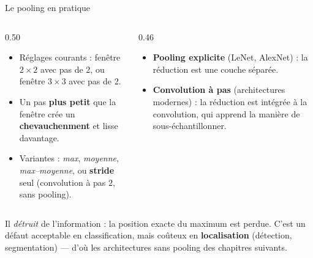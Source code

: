 \begin{frame}{Le pooling en pratique}
\begin{columns}[t]
\begin{column}{0.50\textwidth}
\begin{itemize}
  \item Réglages courants : fenêtre $2 \times 2$ avec pas de $2$, ou
  fenêtre $3 \times 3$ avec pas de $2$.
  \item Un pas \textbf{plus petit} que la fenêtre crée un \textbf{chevauchenment}
  et lisse davantage.
  \item Variantes : \emph{max}, \emph{moyenne}, \emph{max--moyenne}, ou
  \textbf{stride} seul (convolution à pas $2$, sans pooling).
\end{itemize}
\end{column}
\begin{column}{0.46\textwidth}
\begin{ebox}
\begin{itemize}
  \item \textbf{Pooling explicite} (LeNet, AlexNet) : la réduction est une
  couche séparée.
  \item \textbf{Convolution à pas} (architectures modernes) : la réduction est
  intégrée à la convolution, qui apprend la manière de sous-échantillonner.
\end{itemize}
\end{ebox}
\end{column}
\end{columns}
\vspace{1mm}
\begin{wbox}
Il \emph{détruit} de l'information : la position exacte du maximum est perdue.
C'est un défaut acceptable en classification, mais coûteux en \textbf{localisation}
(détection, segmentation) --- d'où les architectures sans pooling des chapitres suivants.
\end{wbox}
\end{frame}

